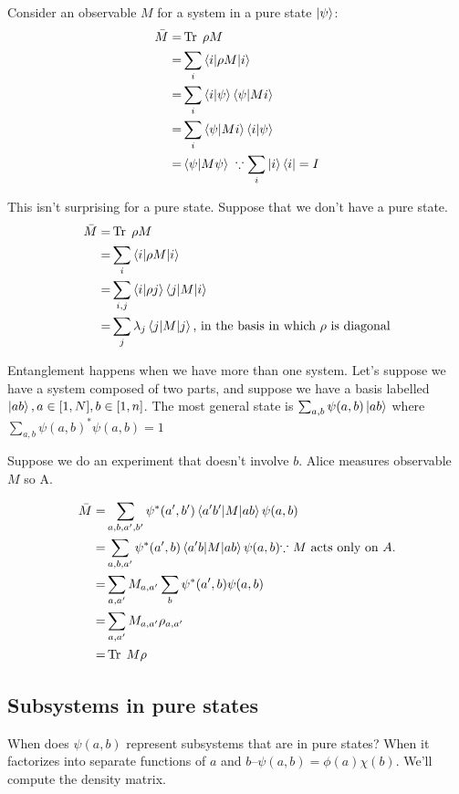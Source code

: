 \documentclass[]{article}
\DeclareMathOperator{\Tr}{Tr \;}
\begin{document}
Consider an observable $M$ for a system in a pure state $\ket{\psi}$:
\begin{align*}
	\bar{M} =& \Tr \rho M\\
	=& \sum_i \braket{i \vert \rho M \vert i}\\
	=& \sum_i \braket{i \vert \psi}\braket{\psi \vert M i}\\
	=& \sum_i \braket{\psi \vert M i} \braket{i \vert \psi}\\
	=& \braket{\psi \vert M \psi} \; \because \sum_i \ket{i}\bra{i}=I
\end{align*}

This isn't surprising for a pure state. Suppose that we don't have a pure state.
\begin{align*}
	\bar{M} =& \Tr \rho M\\
	=& \sum_i \braket{i \vert \rho M \vert i} \\
	=& \sum_{i,j} \braket{i\vert\rho j} \braket{j\vert M \vert i}\\
	=& \sum_j \lambda_j \braket{j\vert M \vert j} \text{, in the basis in which $\rho$ is diagonal}
\end{align*}

Entanglement happens when we have more than one system. Let's suppose we have a system composed of two parts, and suppose we have a basis labelled $\ket{ab}, a \in [1,N], b \in [1,n]$. The most general state is $\sum_{a,b}\psi(a,b)\ket{ab}$ where $\sum_{a,b}\psi(a,b)^*\psi(a,b)=1$

Suppose we do an experiment that doesn't involve $b$. Alice measures observable $M$ so A.

\begin{align*}
	\bar{M}=&\sum_{a,b,a^{\prime},b^{\prime}}\psi^*(a^{\prime},b^{\prime})\braket{a^{\prime}b^{\prime}\vert M \vert ab} \psi(a,b)\\
	=&\sum_{a,b,a^{\prime}}\psi^*(a^{\prime},b)\braket{a^{\prime}b\vert M \vert ab} \psi(a,b) \text{$\because$ $M$ acts only on $A$.}\\
	=& \sum_{a,a^{\prime}}  M_{a,a^\prime} \sum_b \psi^*(a^{\prime},b) \psi(a,b)\\
	=& \sum_{a,a^{\prime}}  M_{a,a^\prime} \rho_{a,a^\prime}\\
	=& \Tr M \rho
\end{align*} 



\subsection{Subsystems in pure states}
When does $\psi(a,b)$ represent subsystems that are in pure states? When it factorizes into separate functions of $a$ and $b$--$\psi(a,b)=\phi(a) \chi(b)$. We'll compute the density matrix.
\end{document}
